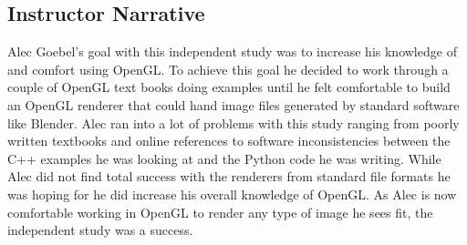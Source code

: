 
\subsection*{Instructor Narrative}
Alec Goebel's goal with this independent study was to increase his
knowledge of and comfort using OpenGL. To achieve this goal he decided
to work through a couple of OpenGL text books doing examples until he
felt comfortable to build an OpenGL renderer that could hand image
files generated by standard software like Blender. Alec ran into a lot
of problems with this study ranging from poorly written textbooks and
online references to software inconsistencies between the C++ examples
he was looking at and the Python code he was writing. While Alec did not
find total success with the renderers from standard file formats he was
hoping for he did increase his overall knowledge of OpenGL. As Alec is
now comfortable working in OpenGL to render any type of image he sees
fit, the independent study was a success.
